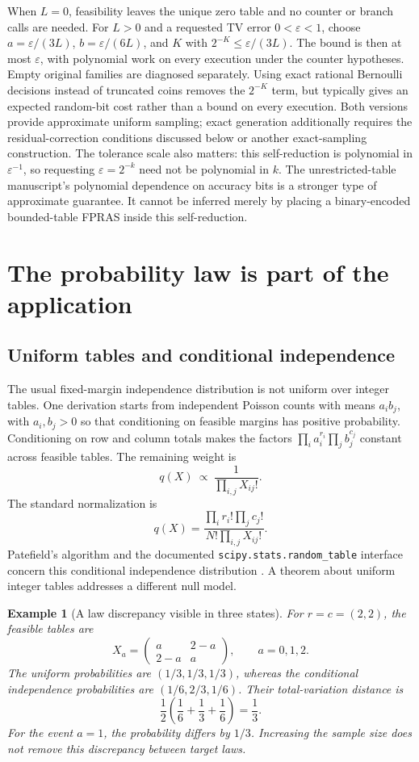\documentclass[11pt]{article}
\newtheorem{example}[proposition]{Example}
\begin{document}
When \(L=0\), feasibility leaves the unique zero table and no counter or branch calls are needed. For \(L>0\) and a requested TV error \(0<\varepsilon<1\), choose \(a=\varepsilon/(3L)\), \(b=\varepsilon/(6L)\), and \(K\) with \(2^{-K}\leq\varepsilon/(3L)\). The bound is then at most \(\varepsilon\), with polynomial work on every execution under the counter hypotheses. Empty original families are diagnosed separately. Using exact rational Bernoulli decisions instead of truncated coins removes the \(2^{-K}\) term, but typically gives an expected random-bit cost rather than a bound on every execution. Both versions provide approximate uniform sampling; exact generation additionally requires the residual-correction conditions discussed below or another exact-sampling construction. The tolerance scale also matters: this self-reduction is polynomial in \(\varepsilon^{-1}\), so requesting \(\varepsilon=2^{-k}\) need not be polynomial in \(k\). The unrestricted-table manuscript's polynomial dependence on accuracy bits is a stronger type of approximate guarantee. It cannot be inferred merely by placing a binary-encoded bounded-table FPRAS inside this self-reduction.

\section{The probability law is part of the application}
\subsection{Uniform tables and conditional independence}
The usual fixed-margin independence distribution is not uniform over integer tables. One derivation starts from independent Poisson counts with means \(a_i b_j\), with \(a_i,b_j>0\) so that conditioning on feasible margins has positive probability. Conditioning on row and column totals makes the factors \(\prod_i a_i^{r_i}\prod_j b_j^{c_j}\) constant across feasible tables. The remaining weight is
\[
 q(X)\ \propto\ \frac{1}{\prod_{i,j}X_{ij}!}.
\]
The standard normalization is
\[
 q(X)=
 \frac{\prod_i r_i!\prod_j c_j!}
      {N!\prod_{i,j}X_{ij}!}.
\]
Patefield's algorithm and the documented \texttt{scipy.stats.random\_table} interface concern this conditional independence distribution \cite{Patefield1981,ScipyRandomTable}. A theorem about uniform integer tables addresses a different null model.

\begin{example}[A law discrepancy visible in three states]
For \(r=c=(2,2)\), the feasible tables are
\[
 X_a=\begin{pmatrix}a&2-a\\2-a&a\end{pmatrix},
 \qquad a=0,1,2.
\]
The uniform probabilities are \((1/3,1/3,1/3)\), whereas the conditional independence probabilities are \((1/6,2/3,1/6)\). Their total-variation distance is
\[
 \frac12\left(\frac16+\frac13+\frac16\right)=\frac13.
\]
For the event \(a=1\), the probability differs by \(1/3\). Increasing the sample size does not remove this discrepancy between target laws.
\end{example}
\end{document}
